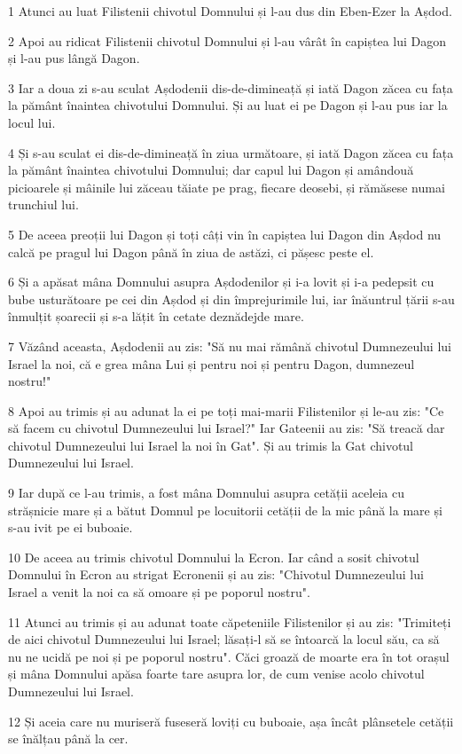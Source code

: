 \par 1 Atunci au luat Filistenii chivotul Domnului și l-au dus din Eben-Ezer la Așdod.
\par 2 Apoi au ridicat Filistenii chivotul Domnului și l-au vârât în capiștea lui Dagon și l-au pus lângă Dagon.
\par 3 Iar a doua zi s-au sculat Așdodenii dis-de-dimineață și iată Dagon zăcea cu fața la pământ înaintea chivotului Domnului. Și au luat ei pe Dagon și l-au pus iar la locul lui.
\par 4 Și s-au sculat ei dis-de-dimineață în ziua următoare, și iată Dagon zăcea cu fața la pământ înaintea chivotului Domnului; dar capul lui Dagon și amândouă picioarele și mâinile lui zăceau tăiate pe prag, fiecare deosebi, și rămăsese numai trunchiul lui.
\par 5 De aceea preoții lui Dagon și toți câți vin în capiștea lui Dagon din Așdod nu calcă pe pragul lui Dagon până în ziua de astăzi, ci pășesc peste el.
\par 6 Și a apăsat mâna Domnului asupra Așdodenilor și i-a lovit și i-a pedepsit cu bube usturătoare pe cei din Așdod și din împrejurimile lui, iar înăuntrul țării s-au înmulțit șoarecii și s-a lățit în cetate deznădejde mare.
\par 7 Văzând aceasta, Așdodenii au zis: "Să nu mai rămână chivotul Dumnezeului lui Israel la noi, că e grea mâna Lui și pentru noi și pentru Dagon, dumnezeul nostru!"
\par 8 Apoi au trimis și au adunat la ei pe toți mai-marii Filistenilor și le-au zis: "Ce să facem cu chivotul Dumnezeului lui Israel?" Iar Gateenii au zis: "Să treacă dar chivotul Dumnezeului lui Israel la noi în Gat". Și au trimis la Gat chivotul Dumnezeului lui Israel.
\par 9 Iar după ce l-au trimis, a fost mâna Domnului asupra cetății aceleia cu strășnicie mare și a bătut Domnul pe locuitorii cetății de la mic până la mare și s-au ivit pe ei buboaie.
\par 10 De aceea au trimis chivotul Domnului la Ecron. Iar când a sosit chivotul Domnului în Ecron au strigat Ecronenii și au zis: "Chivotul Dumnezeului lui Israel a venit la noi ca să omoare și pe poporul nostru".
\par 11 Atunci au trimis și au adunat toate căpeteniile Filistenilor și au zis: "Trimiteți de aici chivotul Dumnezeului lui Israel; lăsați-l să se întoarcă la locul său, ca să nu ne ucidă pe noi și pe poporul nostru". Căci groază de moarte era în tot orașul și mâna Domnului apăsa foarte tare asupra lor, de cum venise acolo chivotul Dumnezeului lui Israel.
\par 12 Și aceia care nu muriseră fuseseră loviți cu buboaie, așa încât plânsetele cetății se înălțau până la cer.


